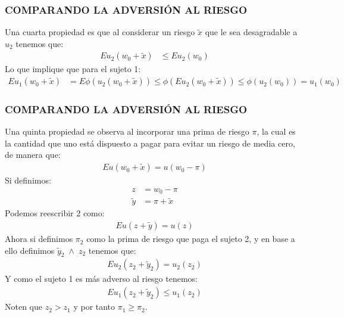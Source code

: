 \documentclass[10pt, xcolor=table, x11names]{beamer}
\begin{document}
\begin{frame}[label=3]
	\frametitle{{\normalsize COMPARANDO LA ADVERSIÓN AL RIESGO} {}}
	
	Una cuarta propiedad es que al considerar un riesgo $\tilde{x}$ que le sea desagradable a $u_{2}$ tenemos que:
	\begin{align}
	 Eu_{2}(w_{0}+\tilde{x})&\leq Eu_{2}(w_{0})\nonumber 
	 \end{align}
	Lo que implique que para el sujeto 1:
	\begin{align}
	Eu_{1}(w_{0}+\tilde{x})&= E\phi(u_{2}(w_{0}+\tilde{x}))\leq \phi(Eu_{2}(w_{0}+\tilde{x}))\leq\phi (u_{2}(w_{0}) )=u_{1}(w_{0})\nonumber 
	\end{align}
	
\end{frame}


\begin{frame}[label=4]
	\frametitle{{\normalsize COMPARANDO LA ADVERSIÓN AL RIESGO} {}}
	
	Una quinta propiedad se observa al incorporar una prima de riesgo $\pi$, la cual es la cantidad que uno está dispuesto a pagar para evitar un riesgo de media cero, de manera que:
	\begin{align}
       Eu(w_{0}+\tilde{x})=u(w_{0}-\pi)
	\end{align}
	Si definimos:
		\begin{align}
		z&=w_{0}-\pi\nonumber\\
		\tilde{y}&=\pi+\tilde{x}\nonumber
		\end{align}
Podemos reescribir 	2 como:
	\begin{align}
	Eu(z+\tilde{y})=u(z)
	\end{align}
Ahora si definimos $\pi_{2}$ como la prima de riesgo que paga el sujeto 2, y en base a ello definimos $\tilde{y}_{2}\; \wedge \;  z_{2}$ tenemos que:
\begin{align}
Eu_{2}(z_{2}+\tilde{y}_{2})=u_{2}(z_{2})\nonumber 
\end{align}	
Y como el sujeto 1 es más adverso al riesgo tenemos:
\begin{align}
Eu_{1}(z_{2}+\tilde{y}_{2})\leq u_{1}(z_{2})\nonumber 
\end{align}	
Noten que $z_{2}>z_{1}$ y por tanto $ \pi_{1}\geq \pi_{2}$.

\end{frame}
\end{document}
